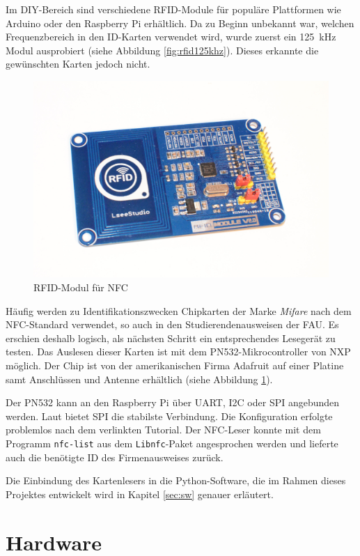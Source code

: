 \documentclass[11pt,a4paper]{IEEEtran}
\begin{document}
Im DIY-Bereich sind verschiedene RFID-Module für populäre Plattformen wie
Arduino oder den Raspberry Pi erhältlich. Da zu Beginn unbekannt war, welchen
Frequenzbereich in den ID-Karten verwendet wird, wurde zuerst ein 
\SI{125}{\kilo\hertz} Modul ausprobiert (siehe Abbildung \ref{fig:rfid125khz}).
Dieses erkannte die gewünschten Karten jedoch nicht. 

\begin{figure}[ht]
    \label{fig:rfidnfc}
    \centering
    \includegraphics[width=.8\columnwidth]{images/nfc_reader}
    \caption{RFID-Modul für NFC}
\end{figure}

Häufig werden zu Identifikationszwecken Chipkarten der Marke \emph{Mifare} nach
dem NFC-Standard verwendet, so auch in den Studierendenausweisen der
FAU\autocite{FauCARD}. Es erschien deshalb logisch, als nächsten Schritt ein
entsprechendes Lesegerät zu testen. Das Auslesen dieser Karten ist mit dem
PN532-Mikrocontroller von NXP möglich. Der Chip ist von der amerikanischen
Firma Adafruit\autocite{AdafruitHP} auf einer Platine samt Anschlüssen und
Antenne erhältlich (siehe Abbildung \ref{fig:rfidnfc}).

Der PN532 kann an den Raspberry Pi über UART, I2C oder SPI angebunden werden.
Laut \autocite{PN532Tutorial} bietet SPI die stabilste Verbindung. Die
Konfiguration erfolgte problemlos nach dem verlinkten Tutorial. Der NFC-Leser
konnte mit dem Programm \texttt{nfc-list} aus dem \texttt{Libnfc}-Paket 
angesprochen werden und lieferte auch die benötigte ID des Firmenausweises
zurück.

Die Einbindung des Kartenlesers in die Python-Software, die im Rahmen dieses 
Projektes entwickelt wird in Kapitel \ref{sec:sw} genauer erläutert.

\section{Hardware} \label{sec:hw}
\end{document}
